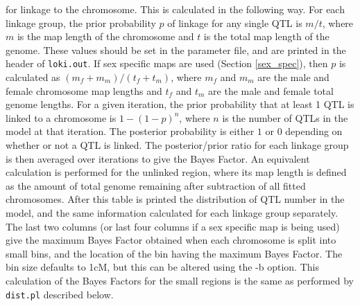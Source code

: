 \documentclass[10pt,a4paper]{article}
\begin{document}
for linkage to the chromosome.  This is calculated in the following way. For
each linkage group, the prior probability $p$ of linkage for any single QTL
is $m/t$, where $m$ is the map length of the chromosome and $t$ is the total
map length of the genome.  These values should be set in the parameter file,
and are printed in the header of \verb+loki.out+.  If sex specific maps are
used (Section \ref{sex_spec}), then $p$ is calculated as
$(m_f+m_m)/(t_f+t_m)$, where $m_f$ and $m_m$ are the male and female
chromosome map lengths and $t_f$ and $t_m$ are the male and female total
genome lengths.  For a given iteration, the prior probability that at least
1 QTL is linked to a chromosome is $1-(1-p)^n$, where $n$ is the number of
QTLs in the model at that iteration.  The posterior probability is either $1$
or $0$ depending on whether or not a QTL is linked.  The posterior/prior
ratio for each linkage group is then averaged over iterations to give the
Bayes Factor. An equivalent calculation is performed for the unlinked
region, where its map length is defined as the amount of total genome
remaining after subtraction of all fitted chromosomes.  After this table is
printed the distribution of QTL number in the model, and the same
information calculated for each linkage group separately.  The last two
columns (or last four columns if a sex specific map is being used) give the
maximum Bayes Factor obtained when each chromosome is split into small bins,
and the location of the bin having the maximum Bayes Factor.  The bin size
defaults to 1cM, but this can be altered using the -b option.  This calculation
of the Bayes Factors for the small regions is the same as performed by
\verb+dist.pl+ described below.
\end{document}
